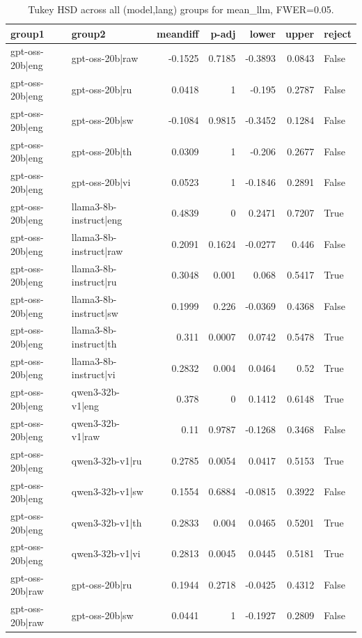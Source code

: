\begin{table}
\caption{Tukey HSD across all (model,lang) groups for mean_llm, FWER=0.05.}
\label{tab:tukey_all_models_all_langs_mean_llm}
\begin{tabular}{l l r r r r l}
\toprule
group1 & group2 & meandiff & p-adj & lower & upper & reject \\
\midrule
gpt-oss-20b|eng & gpt-oss-20b|raw & -0.1525 & 0.7185 & -0.3893 & 0.0843 & False \\
gpt-oss-20b|eng & gpt-oss-20b|ru & 0.0418 & 1 & -0.195 & 0.2787 & False \\
gpt-oss-20b|eng & gpt-oss-20b|sw & -0.1084 & 0.9815 & -0.3452 & 0.1284 & False \\
gpt-oss-20b|eng & gpt-oss-20b|th & 0.0309 & 1 & -0.206 & 0.2677 & False \\
gpt-oss-20b|eng & gpt-oss-20b|vi & 0.0523 & 1 & -0.1846 & 0.2891 & False \\
gpt-oss-20b|eng & llama3-8b-instruct|eng & 0.4839 & 0 & 0.2471 & 0.7207 & True \\
gpt-oss-20b|eng & llama3-8b-instruct|raw & 0.2091 & 0.1624 & -0.0277 & 0.446 & False \\
gpt-oss-20b|eng & llama3-8b-instruct|ru & 0.3048 & 0.001 & 0.068 & 0.5417 & True \\
gpt-oss-20b|eng & llama3-8b-instruct|sw & 0.1999 & 0.226 & -0.0369 & 0.4368 & False \\
gpt-oss-20b|eng & llama3-8b-instruct|th & 0.311 & 0.0007 & 0.0742 & 0.5478 & True \\
gpt-oss-20b|eng & llama3-8b-instruct|vi & 0.2832 & 0.004 & 0.0464 & 0.52 & True \\
gpt-oss-20b|eng & qwen3-32b-v1|eng & 0.378 & 0 & 0.1412 & 0.6148 & True \\
gpt-oss-20b|eng & qwen3-32b-v1|raw & 0.11 & 0.9787 & -0.1268 & 0.3468 & False \\
gpt-oss-20b|eng & qwen3-32b-v1|ru & 0.2785 & 0.0054 & 0.0417 & 0.5153 & True \\
gpt-oss-20b|eng & qwen3-32b-v1|sw & 0.1554 & 0.6884 & -0.0815 & 0.3922 & False \\
gpt-oss-20b|eng & qwen3-32b-v1|th & 0.2833 & 0.004 & 0.0465 & 0.5201 & True \\
gpt-oss-20b|eng & qwen3-32b-v1|vi & 0.2813 & 0.0045 & 0.0445 & 0.5181 & True \\
gpt-oss-20b|raw & gpt-oss-20b|ru & 0.1944 & 0.2718 & -0.0425 & 0.4312 & False \\
gpt-oss-20b|raw & gpt-oss-20b|sw & 0.0441 & 1 & -0.1927 & 0.2809 & False \\

\end{tabular}
\end{table}
